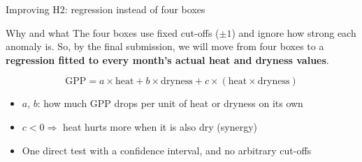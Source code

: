 \documentclass[aspectratio=169,xcolor=table]{beamer}
\begin{document}
\begin{frame}{Improving H2: regression instead of four boxes}

\begin{block}{Why and what}
The four boxes use fixed cut-offs ($\pm1$) and ignore how strong each anomaly is.
So, by the final submission, we will move from four boxes to a
\alert{\textbf{regression fitted to every month's actual heat and dryness values}}.
\end{block}

\vspace{0.6em}
\[
\text{GPP} = a \times \text{heat} + b \times \text{dryness} + c \times (\text{heat} \times \text{dryness})
\]

\begin{itemize}
  \item $a$, $b$: how much GPP drops per unit of heat or dryness on its own
  \item $c < 0 \Rightarrow$ heat hurts more when it is also dry (synergy)
  \item One direct test with a confidence interval, and no arbitrary cut-offs
\end{itemize}

\end{frame}
\end{document}
